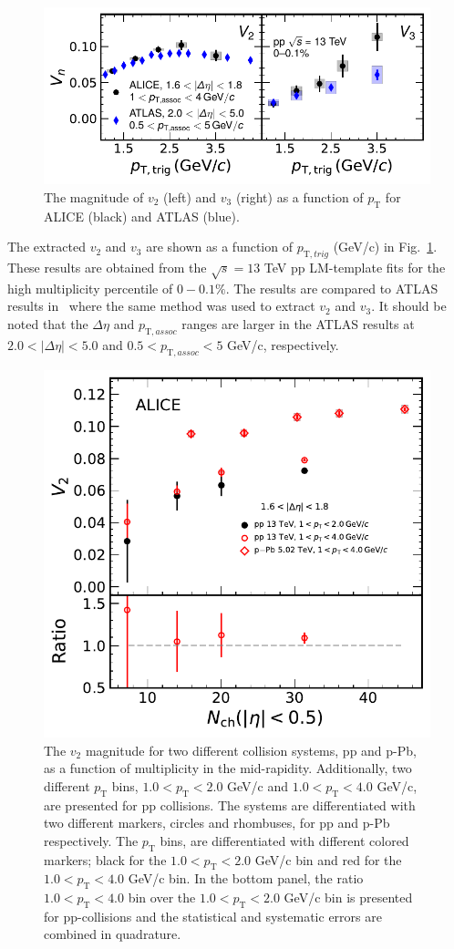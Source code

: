 \begin{figure}[h!]
	\centering
	\includegraphics[width=0.9 \textwidth]{figures/Fig2_vn.pdf} 
	\caption{The magnitude of $v_2$ (left) and $v_3$ (right) as a function of $p_\mathrm{T}$ for ALICE (black) and ATLAS (blue).}
	\label{fig:vn}
\end{figure}

The extracted $v_2$ and $v_3$ are shown as a function of $p_{\mathrm{T},trig}$ (GeV/c) in Fig.~\ref{fig:vn}. These results are obtained from the $\sqrt{s}=13$ TeV pp LM-template fits for the high multiplicity percentile of $0-0.1\%$. The results are compared to ATLAS results in~\cite{Aaboud:2016yar} where the same method was used to extract $v_2$ and $v_3$. It should be noted that the $\Delta\eta$ and $p_{\mathrm{T},assoc}$ ranges are larger in the ATLAS results at $2.0<|\Delta\eta|<5.0$ and $0.5<p_{\mathrm{T},assoc}<5$ GeV/c, respectively.



\begin{figure}[h!]
	\centering
	\includegraphics[width=0.6 \textwidth]{figures/Fig6_v2Mult_allSystemsComp2.pdf} 
	\caption{The $v_2$ magnitude for two different collision systems, pp and p-Pb, as a function of multiplicity in the mid-rapidity. Additionally, two different $p_\mathrm{T}$ bins, $1.0<p_\mathrm{T}<2.0$ GeV/c and $1.0<p_\mathrm{T}<4.0$ GeV/c, are presented for pp collisions. The systems are differentiated with two different markers, circles and rhombuses, for pp and p-Pb respectively. The $p_\mathrm{T}$ bins, are differentiated with different colored markers; black for the $1.0<p_\mathrm{T}<2.0$ GeV/c bin and red for the $1.0<p_\mathrm{T}<4.0$ GeV/c bin. In the bottom panel, the ratio $1.0<p_\mathrm{T}<4.0$ bin over the $1.0<p_\mathrm{T}<2.0$ GeV/c bin is presented for pp-collisions and the statistical and systematic errors are combined in quadrature.} 
	\label{fig:v2mult}
\end{figure}

